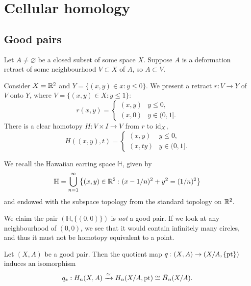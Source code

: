 \section{Cellular homology}

\subsection{Good pairs}

\begin{definition}
  Let $A \neq \varnothing$ be a closed subset of some space $X$. Suppose $A$ is a deformation retract of some neighbourhood $V \subset X$ of $A$, so $A \subset V$.
\end{definition}

\begin{example}
  Consider $X = \mathbb{R}^2$ and $Y = \{(x,y) \in x: y \leq 0\}$. We present a retract $r: V \to Y$ of $V$ onto $Y$, where $V = \{(x,y) \in X: y \leq 1\}$:
  \[
    r(x,y) = \begin{cases}
      (x,y) & y \leq 0,    \\
      (x,0) & y \in (0,1].
    \end{cases}
  \]
  There is a clear homotopy $H: V \times I \to V$ from $r$ to $\operatorname{id}_X$,
  \[
    H((x,y),t) = \begin{cases}
      (x,y)  & y \leq 0,    \\
      (x,ty) & y \in (0,1].
    \end{cases}
  \]

\end{example}

We recall the Hawaiian earring space $\mathbb H$, given by
\[
  \mathbb H = \bigcup_{n=1}^\infty \left\{
  (x,y) \in \mathbb{R}^2: (x-1/n)^2 + y^2 = (1/n)^2
  \right\}
\]
and endowed with the subspace topology from the standard topology on $\mathbb{R}^2$.

\begin{example}
  We claim the pair $(\mathbb H, \{(0,0)\})$ is \emph{not} a good pair. If we look at any neighbourhood of $(0,0)$, we see that it would contain infinitely many circles, and thus it must not be homotopy equivalent to a point.
\end{example}

\begin{theorem}
  Let $(X, A)$ be a good pair. Then the quotient map $q: (X,A) \to (X/A, \{\operatorname{pt}\})$ induces an isomorphism \[q_*: H_n(X,A) \xrightarrow{\cong} H_n(X/A, \operatorname{pt}) \cong \tilde H_n(X/A).\]
\end{theorem}

